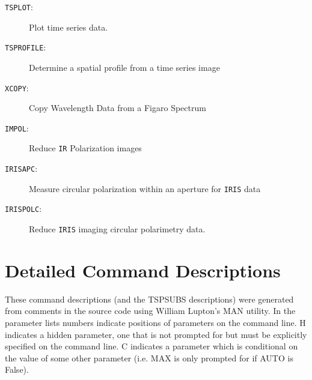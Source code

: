 \documentclass[11pt,twoside,nolof,noabs]{starlink}
\newenvironment{mansectionroutines}{\begin{description}}{\end{description}}
\newcommand{\mansectionitem}[1]{\item[#1:]}
\providecommand{\mantt}[1]{\texttt{#1}}
\begin{document}
\begin{mansectionroutines}
\mansectionitem{{\mantt{TSPLOT}}}
        Plot time series data.

\mansectionitem{{\mantt{TSPROFILE}}}
        Determine a spatial profile from a time series image

\mansectionitem{{\mantt{XCOPY}}}
        Copy Wavelength Data from a Figaro Spectrum

\mansectionitem{{\mantt{IMPOL}}}
        Reduce {\mantt{IR}} Polarization images

\mansectionitem{{\mantt{IRISAPC}}}
        Measure circular polarization within an aperture for {\mantt{IRIS}} data

\mansectionitem{{\mantt{IRISPOLC}}}
        Reduce {\mantt{IRIS}} imaging circular polarimetry data.

\end{mansectionroutines}



\newpage
\section{Detailed Command Descriptions}

These command descriptions (and the TSPSUBS descriptions) were generated from
comments in the source code using William Lupton's MAN utility. In the
parameter lists numbers indicate positions of parameters on the command
line. H indicates a hidden parameter, one that is not prompted for but must
be explicitly specified on the command line. C indicates a parameter which
is conditional on the value of some other parameter (i.e. MAX is only prompted
for if AUTO is False).
\end{document}

